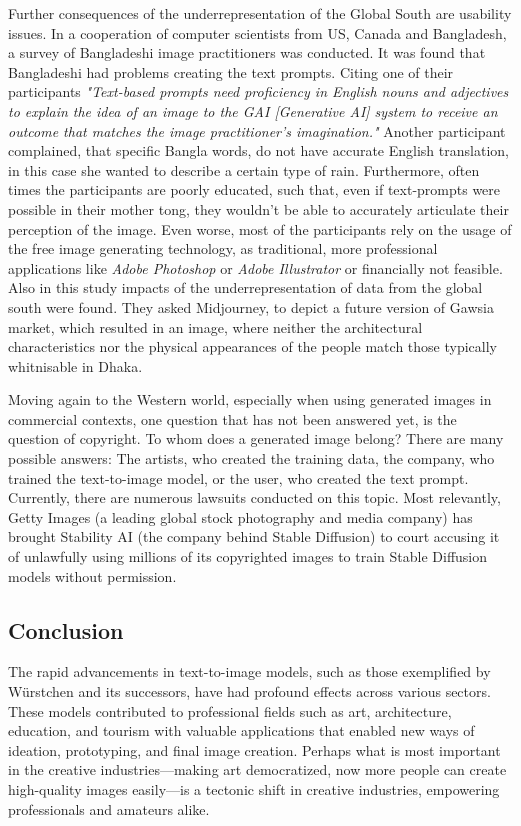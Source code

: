 \documentclass[11pt]{article}
\begin{document}
Further consequences of the underrepresentation of the Global South are usability issues. In a cooperation of computer scientists from US, Canada and Bangladesh\cite{mim2024impactoftexttoimagetoolsinglobalsouth}, a survey of Bangladeshi image practitioners was conducted. It was found that Bangladeshi had problems creating the text prompts. Citing one of their participants \textit{"Text-based prompts need proficiency in English nouns and adjectives to explain the idea of an image to the GAI [Generative AI] system to receive an outcome that matches the image practitioner's imagination."} Another participant complained, that specific Bangla words, do not have accurate English translation, in this case she wanted to describe a certain type of rain. Furthermore, often times the participants are poorly educated, such that, even if text-prompts were possible in their mother tong, they wouldn't be able to accurately articulate their perception of the image. Even worse, most of the participants rely on the usage of the free image generating technology, as traditional, more professional applications like \textit{Adobe Photoshop} or \textit{Adobe Illustrator} or financially not feasible. Also in this study impacts of the underrepresentation of data from the global south were found. They asked Midjourney, to depict a future version of Gawsia market, which resulted in an image, where neither the architectural characteristics nor the physical appearances of the people match those typically whitnisable in Dhaka.

Moving again to the Western world, especially when using generated images in commercial contexts, one question that has not been answered yet, is the question of copyright. To whom does a generated image belong? There are many possible answers: The artists, who created the training data, the company, who trained the text-to-image model, or the user, who created the text prompt. Currently, there are numerous lawsuits conducted on this topic. Most relevantly, Getty Images (a leading global stock photography and media company) has brought Stability AI (the company behind Stable Diffusion) to court accusing it of unlawfully using millions of its copyrighted images to train Stable Diffusion models without permission\cite{cnn2023gettyimagesvsstabilityai}.

\subsection{Conclusion}

The rapid advancements in text-to-image models, such as those exemplified by Würstchen and its successors, have had profound effects across various sectors. These models contributed to professional fields such as art, architecture, education, and tourism with valuable applications that enabled new ways of ideation, prototyping, and final image creation. Perhaps what is most important in the creative industries—making art democratized, now more people can create high-quality images easily—is a tectonic shift in creative industries, empowering professionals and amateurs alike.
\end{document}

